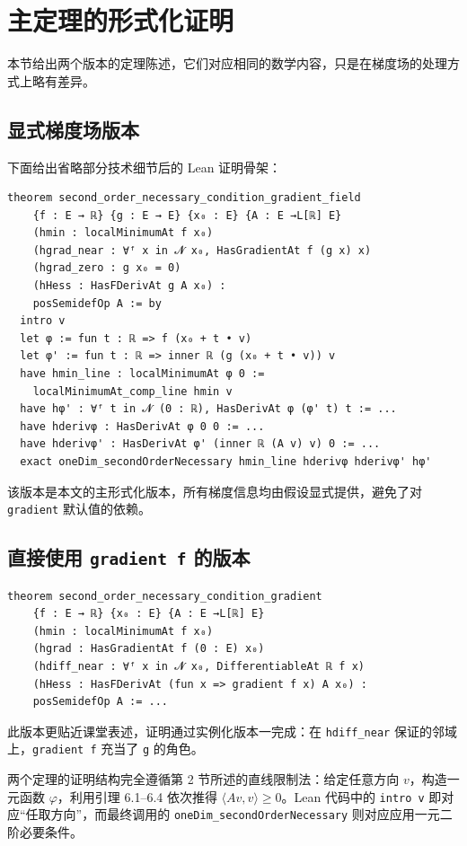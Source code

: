 ﻿\documentclass[UTF8,a4paper,zihao=-4]{ctexart}
\begin{document}
\section{主定理的形式化证明}
本节给出两个版本的定理陈述，它们对应相同的数学内容，只是在梯度场的处理方式上略有差异。

\subsection{显式梯度场版本}
下面给出省略部分技术细节后的 Lean 证明骨架：
\begin{verbatim}
theorem second_order_necessary_condition_gradient_field
    {f : E → ℝ} {g : E → E} {x₀ : E} {A : E →L[ℝ] E}
    (hmin : localMinimumAt f x₀)
    (hgrad_near : ∀ᶠ x in 𝓝 x₀, HasGradientAt f (g x) x)
    (hgrad_zero : g x₀ = 0)
    (hHess : HasFDerivAt g A x₀) :
    posSemidefOp A := by
  intro v
  let φ := fun t : ℝ => f (x₀ + t • v)
  let φ' := fun t : ℝ => inner ℝ (g (x₀ + t • v)) v
  have hmin_line : localMinimumAt φ 0 :=
    localMinimumAt_comp_line hmin v
  have hφ' : ∀ᶠ t in 𝓝 (0 : ℝ), HasDerivAt φ (φ' t) t := ...
  have hderivφ : HasDerivAt φ 0 0 := ...
  have hderivφ' : HasDerivAt φ' (inner ℝ (A v) v) 0 := ...
  exact oneDim_secondOrderNecessary hmin_line hderivφ hderivφ' hφ'
\end{verbatim}
该版本是本文的主形式化版本，所有梯度信息均由假设显式提供，避免了对 \texttt{gradient} 默认值的依赖。

\subsection{直接使用 \texttt{gradient f} 的版本}
\begin{verbatim}
theorem second_order_necessary_condition_gradient
    {f : E → ℝ} {x₀ : E} {A : E →L[ℝ] E}
    (hmin : localMinimumAt f x₀)
    (hgrad : HasGradientAt f (0 : E) x₀)
    (hdiff_near : ∀ᶠ x in 𝓝 x₀, DifferentiableAt ℝ f x)
    (hHess : HasFDerivAt (fun x => gradient f x) A x₀) :
    posSemidefOp A := ...
\end{verbatim}
此版本更贴近课堂表述，证明通过实例化版本一完成：在 \texttt{hdiff\_near} 保证的邻域上，\texttt{gradient f} 充当了 \texttt{g} 的角色。

两个定理的证明结构完全遵循第 2 节所述的直线限制法：给定任意方向 \(v\)，构造一元函数 \(\varphi\)，利用引理 6.1–6.4 依次推得 \(\langle A v, v\rangle \ge 0\)。Lean 代码中的 \texttt{intro v} 即对应“任取方向”，而最终调用的 \texttt{oneDim\_secondOrderNecessary} 则对应应用一元二阶必要条件。
\end{document}
